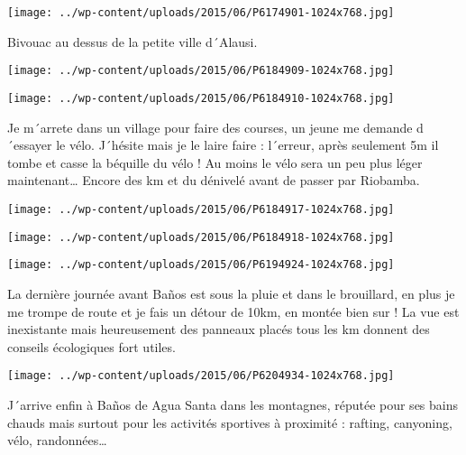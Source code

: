  \newline
 \newline
\centerline{\texttt{[image: ../wp-content/uploads/2015/06/P6174901-1024x768.jpg]} } 
 \newline
 Bivouac au dessus de la petite ville d´Alausi. \newline
 \newline
\centerline{\texttt{[image: ../wp-content/uploads/2015/06/P6184909-1024x768.jpg]} } 
 \newline
 \newline
\centerline{\texttt{[image: ../wp-content/uploads/2015/06/P6184910-1024x768.jpg]} } 
 \newline
 Je m´arrete dans un village pour faire des courses, un jeune me demande d´essayer le vélo. J´hésite mais je le laire faire : l´erreur, après seulement 5m il tombe et casse la béquille du vélo ! Au moins le vélo sera un peu plus léger maintenant… \newline
 Encore des km et du dénivelé avant de passer par Riobamba. \newline
 \newline
\centerline{\texttt{[image: ../wp-content/uploads/2015/06/P6184917-1024x768.jpg]} } 
 \newline
 \newline
\centerline{\texttt{[image: ../wp-content/uploads/2015/06/P6184918-1024x768.jpg]} } 
 \newline
 \newline
\centerline{\texttt{[image: ../wp-content/uploads/2015/06/P6194924-1024x768.jpg]} } 
 \newline
 La dernière journée avant Baños est sous la pluie et dans le brouillard, en plus je me trompe de route et je fais un détour de 10km, en montée bien sur ! \newline
 La vue est inexistante mais heureusement des panneaux placés tous les km donnent des conseils écologiques fort utiles. \newline
 \newline
\centerline{\texttt{[image: ../wp-content/uploads/2015/06/P6204934-1024x768.jpg]} } 
 \newline
 J´arrive enfin à Baños de Agua Santa dans les montagnes, réputée pour ses bains chauds mais surtout pour les activités sportives à proximité : rafting, canyoning, vélo, randonnées… \newline
 \newline
